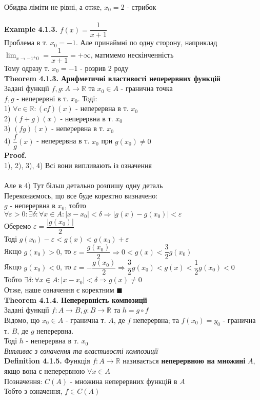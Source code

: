 \documentclass[a4paper, 14pt]{extarticle}
\def\huge{\displaystyle}
\def\bigline{\vspace{5mm}\\}
\def\defin#1{\textbf{Definition {#1}}}
\def\ex#1{\textbf{Example {#1}}}
\def\th#1{\textbf{Theorem {#1}}}
\def\proof{\textbf{Proof.}\\}
\def\bigline{\vspace{5mm}\\}
\def\qed{$\blacksquare$}
\begin{document}
Обидва ліміти не рівні, а отже, $x_0 = 2$ - стрибок\\
\\
\ex{4.1.3.} $f(x) = \dfrac{1}{x+1}$\\
Проблема в т. $x_0 = -1$. Але принаймні по одну сторону, наприклад $\huge \lim_{x \to -1^+0} =\dfrac{1}{x+1} = +\infty$, матимемо нескінченність\\
Тому одразу т. $x_0 = -1$ - розрив 2 роду
\bigline
\th{4.1.3. Арифметичні властивості неперервних функцій}\\
Задані функції $f,g: A \to \mathbb{R}$ та $x_0 \in A$ - гранична точка\\
$f,g$ - неперервні в т. $x_0$. Тоді:\\
1) $\forall c \in \mathbb{R}: (cf)(x)$ - неперервна в т. $x_0$\\
2) $(f+g)(x)$ - неперервна в т. $x_0$\\
3) $(fg)(x)$ - неперервна в т. $x_0$\\
4) $\dfrac{f}{g}(x)$ - неперервна в т. $x_0$ при $g(x_0) \neq 0$\\
\proof
1), 2), 3), 4) Всі вони випливають із означення\\ \\
Але в 4) Тут більш детально розпишу одну деталь\\
Переконаємось, що все буде коректно визначено:\\
$g$ - неперервна в $x_0$, тобто $\forall \varepsilon > 0: \exists \delta: \forall x \in A: |x-x_0|<\delta \Rightarrow |g(x)-g(x_0)|<\varepsilon$\\
Оберемо $\varepsilon = \dfrac{|g(x_0)|}{2}$\\
Тоді $g(x_0)-\varepsilon <g(x) <g(x_0)+\varepsilon$\\
Якщо $g(x_0) > 0$, то $\varepsilon = \dfrac{g(x_0)}{2} \Rightarrow 0 < g(x) < \dfrac{3}{2}g(x_0)$\\
Якщо $g(x_0) < 0$, то $\varepsilon = -\dfrac{g(x_0)}{2} \Rightarrow \dfrac{3}{2}g(x_0) < g(x) < \dfrac{1}{2}g(x_0) < 0$\\
Тобто $\exists \delta: \forall x \in A: |x-x_0|<\delta \Rightarrow g(x) \neq 0$\\
Отже, наше означення є коректним \qed
\bigline

\th{4.1.4. Неперервність композиції}\\
Задані функції $f: A \to B, g: B \to \mathbb{R}$ та $h = g \circ f$\\
Відомо, що $x_0 \in A$ - гранична т. $A$, де $f$ неперервна; та $f(x_0) = y_0$ - гранична т. $B$, де $g$ неперервна.\\
Тоді $h$ - неперервна в т. $x_0$\\
\textit{Випливає з означення та властивості композиції}
\bigline
\defin{4.1.5.} Функція $f: A \to \mathbb{R}$ називається \textbf{неперервною на множині} $A$, якщо вона є неперервною $\forall x \in A$\\
Позначення: $C(A)$ - множина неперервних функцій в $A$\\
Тобто з означення, $f \in C(A)$
\bigline
\end{document}
